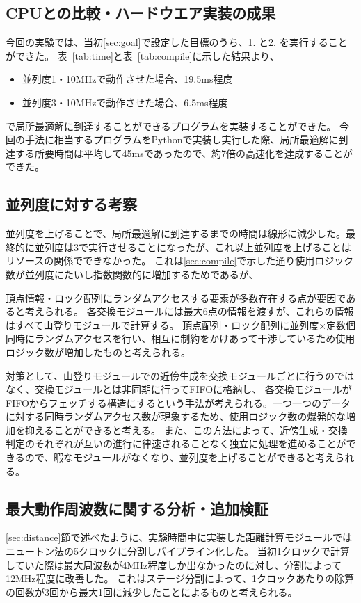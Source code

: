 \subsection{CPUとの比較・ハードウエア実装の成果}
今回の実験では、当初\ref{sec:goal}で設定した目標のうち、1. と2. を実行することができた。
表~\ref{tab:time}と表~\ref{tab:compile}に示した結果より、
\begin{itemize}
    \item 並列度1・10MHzで動作させた場合、19.5ms程度
    \item 並列度3・10MHzで動作させた場合、6.5ms程度
\end{itemize}
で局所最適解に到達することができるプログラムを実装することができた。
今回の手法に相当するプログラムをPythonで実装し実行した際、局所最適解に到達する所要時間は平均して45msであったので、約7倍の高速化を達成することができた。

\subsection{並列度に対する考察}
並列度を上げることで、局所最適解に到達するまでの時間は線形に減少した。最終的に並列度は3で実行させることになったが、これ以上並列度を上げることはリソースの関係でできなかった。
これは\ref{sec:compile}で示した通り使用ロジック数が並列度にたいし指数関数的に増加するためであるが、

頂点情報・ロック配列にランダムアクセスする要素が多数存在する点が要因であると考えられる。
各交換モジュールには最大6点の情報を渡すが、これらの情報はすべて山登りモジュールで計算する。
頂点配列・ロック配列に並列度×定数個同時にランダムアクセスを行い、相互に制約をかけあって干渉しているため使用ロジック数が増加したものと考えられる。

対策として、山登りモジュールでの近傍生成を交換モジュールごとに行うのではなく、交換モジュールとは非同期に行ってFIFOに格納し、
各交換モジュールがFIFOからフェッチする構造にするという手法が考えられる。一つ一つのデータに対する同時ランダムアクセス数が現象するため、使用ロジック数の爆発的な増加を抑えることができると考える。
また、この方法によって、近傍生成・交換判定のそれぞれが互いの進行に律速されることなく独立に処理を進めることができるので、暇なモジュールがなくなり、並列度を上げることができると考えられる。

\subsection{最大動作周波数に関する分析・追加検証}
\ref{sec:distance}節で述べたように、実験時間中に実装した距離計算モジュールではニュートン法の5クロックに分割しパイプライン化した。
当初1クロックで計算していた際は最大周波数が4MHz程度しか出なかったのに対し、分割によって12MHz程度に改善した。
これはステージ分割によって、1クロックあたりの除算の回数が3回から最大1回に減少したことによるものと考えられる。

